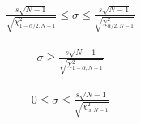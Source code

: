 \documentclass[12pt]{article}
\begin{document}
\pagestyle{empty} 
\Large
{}
\pagecolor{ehandbook}

\boldmath

\hspace*{.25in}

\begin{eqnarray*}
\frac{s\sqrt{N-1}}{\sqrt{ \chi^2_{1-\alpha/2, N-1}  }} \le \sigma \le 
\frac{s\sqrt{N-1}}{\sqrt{ \chi^2_{\alpha/2, N-1}  }}
\end{eqnarray*}

\hspace*{.25in}

\begin{eqnarray*}
\sigma \ge \frac{s\sqrt{N-1}}{\sqrt{ \chi^2_{1-\alpha, N-1}  }}
\end{eqnarray*}

\hspace*{.25in}

\begin{eqnarray*}
0 \le \sigma \le \frac{s\sqrt{N-1}}{\sqrt{ \chi^2_{\alpha, N-1}  }}
\end{eqnarray*}
\end{document}
